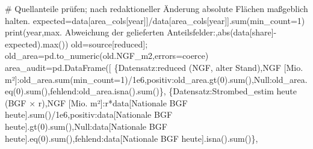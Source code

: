 \documentclass[
  ngerman,
  a4paper,
  DIV=11]{scrreprt}
\newenvironment{Shaded}{\begin{snugshade}}{\end{snugshade}}
\newcommand{\BuiltInTok}[1]{\textcolor[rgb]{0.00,0.23,0.31}{#1}}
\newcommand{\CommentTok}[1]{\textcolor[rgb]{0.37,0.37,0.37}{#1}}
\newcommand{\DecValTok}[1]{\textcolor[rgb]{0.68,0.00,0.00}{#1}}
\newcommand{\FloatTok}[1]{\textcolor[rgb]{0.68,0.00,0.00}{#1}}
\newcommand{\NormalTok}[1]{\textcolor[rgb]{0.00,0.23,0.31}{#1}}
\newcommand{\OperatorTok}[1]{\textcolor[rgb]{0.37,0.37,0.37}{#1}}
\newcommand{\StringTok}[1]{\textcolor[rgb]{0.13,0.47,0.30}{#1}}
\begin{document}
\begin{Shaded}
\begin{Highlighting}[]
    \CommentTok{\# Quellanteile prüfen; nach redaktioneller Änderung absolute Flächen maßgeblich halten.}
\NormalTok{    expected}\OperatorTok{=}\NormalTok{data[area\_cols[year]]}\OperatorTok{/}\NormalTok{data[area\_cols[year]].}\BuiltInTok{sum}\NormalTok{(min\_count}\OperatorTok{=}\DecValTok{1}\NormalTok{)}
    \BuiltInTok{print}\NormalTok{(year,}\StringTok{\textquotesingle{}max. Abweichung der gelieferten Anteilsfelder:\textquotesingle{}}\NormalTok{,}\BuiltInTok{abs}\NormalTok{(data[share]}\OperatorTok{{-}}\NormalTok{expected).}\BuiltInTok{max}\NormalTok{())}
\NormalTok{old}\OperatorTok{=}\NormalTok{source[}\StringTok{\textquotesingle{}reduced\textquotesingle{}}\NormalTok{]}\OperatorTok{;}\NormalTok{ old\_area}\OperatorTok{=}\NormalTok{pd.to\_numeric(old.NGF\_m2,errors}\OperatorTok{=}\StringTok{\textquotesingle{}coerce\textquotesingle{}}\NormalTok{)}
\NormalTok{area\_audit}\OperatorTok{=}\NormalTok{pd.DataFrame([}
\NormalTok{ \{}\StringTok{\textquotesingle{}Datensatz\textquotesingle{}}\NormalTok{:}\StringTok{\textquotesingle{}reduced (NGF, alter Stand)\textquotesingle{}}\NormalTok{,}\StringTok{\textquotesingle{}NGF [Mio. m²]\textquotesingle{}}\NormalTok{:old\_area.}\BuiltInTok{sum}\NormalTok{(min\_count}\OperatorTok{=}\DecValTok{1}\NormalTok{)}\OperatorTok{/}\FloatTok{1e6}\NormalTok{,}\StringTok{\textquotesingle{}positiv\textquotesingle{}}\NormalTok{:old\_area.gt(}\DecValTok{0}\NormalTok{).}\BuiltInTok{sum}\NormalTok{(),}\StringTok{\textquotesingle{}Null\textquotesingle{}}\NormalTok{:old\_area.eq(}\DecValTok{0}\NormalTok{).}\BuiltInTok{sum}\NormalTok{(),}\StringTok{\textquotesingle{}fehlend\textquotesingle{}}\NormalTok{:old\_area.isna().}\BuiltInTok{sum}\NormalTok{()\},}
\NormalTok{ \{}\StringTok{\textquotesingle{}Datensatz\textquotesingle{}}\NormalTok{:}\StringTok{\textquotesingle{}Strombed\_estim heute (BGF × r)\textquotesingle{}}\NormalTok{,}\StringTok{\textquotesingle{}NGF [Mio. m²]\textquotesingle{}}\NormalTok{:r}\OperatorTok{*}\NormalTok{data[}\StringTok{\textquotesingle{}Nationale BGF heute\textquotesingle{}}\NormalTok{].}\BuiltInTok{sum}\NormalTok{()}\OperatorTok{/}\FloatTok{1e6}\NormalTok{,}\StringTok{\textquotesingle{}positiv\textquotesingle{}}\NormalTok{:data[}\StringTok{\textquotesingle{}Nationale BGF heute\textquotesingle{}}\NormalTok{].gt(}\DecValTok{0}\NormalTok{).}\BuiltInTok{sum}\NormalTok{(),}\StringTok{\textquotesingle{}Null\textquotesingle{}}\NormalTok{:data[}\StringTok{\textquotesingle{}Nationale BGF heute\textquotesingle{}}\NormalTok{].eq(}\DecValTok{0}\NormalTok{).}\BuiltInTok{sum}\NormalTok{(),}\StringTok{\textquotesingle{}fehlend\textquotesingle{}}\NormalTok{:data[}\StringTok{\textquotesingle{}Nationale BGF heute\textquotesingle{}}\NormalTok{].isna().}\BuiltInTok{sum}\NormalTok{()\},}

\end{Highlighting}
\end{Shaded}
\end{document}
